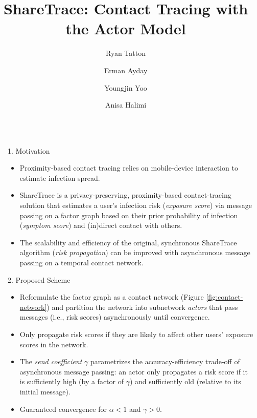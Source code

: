 \documentclass[final]{beamer}
\title{ShareTrace: Contact Tracing with the Actor Model}
\author{Ryan Tatton \and Erman Ayday \and Youngjin Yoo \and Anisa Halimi}
\institute[shortinst]{Case Western Restern Reserve University}
\newlength{\sepwidth}
\newlength{\colwidth}
\newcommand{\separatorcolumn}{\begin{column}{\sepwidth}\end{column}}
\newcommand{\vTransmissionRate}{\alpha}
\newcommand{\vSendCoefficient}{\gamma}
\newcommand{\vFactor}[2]{f_{#1#2}}
\begin{document}
\begin{frame}[t]
\begin{columns}[t]
\separatorcolumn
\begin{column}{\colwidth}
	\begin{block}{1. Motivation}
		\begin{itemize}
			\item Proximity-based contact tracing relies on mobile-device interaction to estimate infection spread.
			\item ShareTrace is a privacy-preserving, proximity-based contact-tracing solution that estimates a user's infection risk (\emph{exposure score}) via message passing on a factor graph based on their prior probability of infection (\emph{symptom score}) and (in)direct contact with others.
			\item The scalability and efficiency of the original, synchronous ShareTrace algorithm (\emph{risk propagation}) \cite{Ayday2021} can be improved with asynchronous message passing on a temporal contact network.
		\end{itemize}
	\end{block}
	\begin{block}{2. Proposed Scheme}
		\begin{itemize}
			\item Reformulate the factor graph as a contact network (Figure \ref{fig:contact-network}) and partition the network into subnetwork \emph{actors} \cite{Agha1986} that pass messages (i.e., risk scores) asynchronously until convergence.
			\item Only propagate risk scores if they are likely to affect other users' exposure scores in the network.
			\item The \emph{send coefficient} $\vSendCoefficient$ parametrizes the accuracy-efficiency trade-off of asynchronous message passing: an actor only propagates a risk score if it is sufficiently high (by a factor of $\vSendCoefficient$) and sufficiently old (relative to its initial message).
			\item Guaranteed convergence for $\vTransmissionRate < 1$ and $\vSendCoefficient > 0$.
		\end{itemize}
		\begin{figure}
			\centering
			\resizebox{0.75\columnwidth}{!}{%
				\begin{tikzpicture}[baseline={(0,0)}, ampersand replacement=\&]
					\matrix[row sep=1em] at  (-4, 0)
					{%
						\& \factor[minimum size=0.5em] {f12} {above:$\vFactor{1}{2}$} {} {}; \&\&
						\factor[minimum size=0.5em] {f23} {above:$\vFactor{2}{3}$} {} {}; \& \\
}
\end{tikzpicture}}
\end{figure}
\end{block}
\end{column}
\end{columns}
\end{frame}
\end{document}
